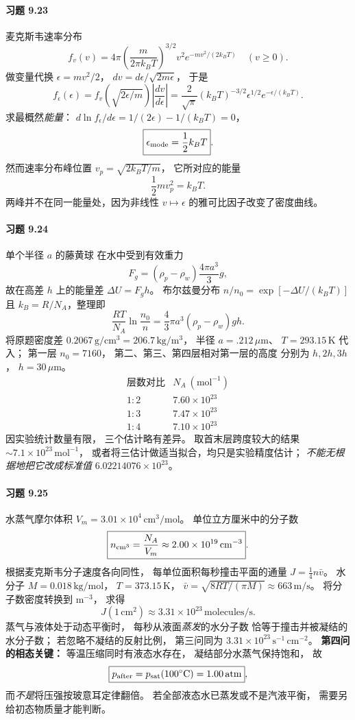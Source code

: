 \paragraph{习题 9.23}
麦克斯韦速率分布
\[
 f_v(v)=4\pi\left(\frac m{2\pi k_BT}\right)^{3/2}
 v^2e^{-mv^2/(2k_BT)}
\quad(v\ge0).
\]
做变量代换
\(\epsilon=mv^2/2\)，
\(dv=d\epsilon/\sqrt{2m\epsilon}\)，
于是
\[
 f_\epsilon(\epsilon)=f_v(\sqrt{2\epsilon/m})
 \left|\frac{dv}{d\epsilon}\right|
 =\boxed{\frac2{\sqrt\pi}(k_BT)^{-3/2}
 \epsilon^{1/2}e^{-\epsilon/(k_BT)}}.
\]
求最概然\emph{能量}：
\(d\ln f_\epsilon/d\epsilon
 =1/(2\epsilon)-1/(k_BT)=0\)，
\[
 \boxed{\epsilon_{\rm mode}=\frac12k_BT}.
\]
然而速率分布峰位置
\(v_p=\sqrt{2k_BT/m}\)，
它所对应的能量
\[
 \boxed{\frac12mv_p^2=k_BT}.
\]
两峰并不在同一能量处，因为非线性
\(v\mapsto\epsilon\) 的雅可比因子改变了密度曲线。

\paragraph{习题 9.24}
单个半径 \(a\) 的藤黄球
在水中受到有效重力
\[
 F_g=(\rho_p-\rho_w)\frac{4\pi a^3}{3}g,
\]
故在高差 \(h\) 上的能量差
\(\Delta U=F_gh\)。
布尔兹曼分布
\(n/n_0=\exp[-\Delta U/(k_BT)]\)
且 \(k_B=R/N_A\)，整理即
\[
 \boxed{\frac{RT}{N_A}\ln\frac{n_0}{n}
 =\frac43\pi a^3(\rho_p-\rho_w)gh}.
\]
将原题密度差
\(0.2067\,\mathrm{g/cm^3}=206.7\,\mathrm{kg/m^3}\)，
半径 \(a=.212\,\mu\mathrm m\)、
\(T=293.15\,\mathrm K\) 代入；
第一层 \(n_0=7160\)，
第二、第三、第四层相对第一层的高度
分别为 \(h,2h,3h\)，
\(h=30\,\mu\mathrm m\)。
\[
 \begin{array}{c|c}
 \text{层数对比}&N_A\ (\mathrm{mol^{-1}})\\\hline
 1:2&7.60\times10^{23}\\
 1:3&7.47\times10^{23}\\
 1:4&7.10\times10^{23}
 \end{array}
\]
因实验统计数量有限，
三个估计略有差异。
取首末层跨度较大的结果
\(\sim7.1\times10^{23}\,\mathrm{mol^{-1}}\)，
或者将三估计做适当拟合，均只是实验精度估计；
\emph{不能无根据地把它改成标准值}
\(6.02214076\times10^{23}\)。

\paragraph{习题 9.25}
水蒸气摩尔体积
\(V_m=3.01\times10^4\,\mathrm{cm^3/mol}\)。
单位立方厘米中的分子数
\[
 \boxed{n_{\rm cm^3}=\frac{N_A}{V_m}
 \approx2.00\times10^{19}\,\mathrm{cm^{-3}}}.
\]
根据麦克斯韦分子速度各向同性，
每单位面积每秒撞击平面的通量
\(J=\tfrac14n\bar v\)。
水分子
\(M=0.018\,\mathrm{kg/mol}\)，
\(T=373.15\,\mathrm K\)，
\(\bar v=\sqrt{8RT/(\pi M)}\approx663\,\mathrm{m/s}\)。
将分子数密度转换到 \(\mathrm{m^{-3}}\)，
求得
\[
 \boxed{J(1\,\mathrm{cm^2})
 \approx3.31\times10^{23}\,
 \mathrm{molecules/s}}.
\]
蒸气与液体处于动态平衡时，
每秒从液面\emph{蒸发}的水分子数
恰等于撞击并被凝结的水分子数；
若忽略不凝结的反射比例，
第三问同为
\(\boxed{3.31\times10^{23}\,\mathrm{s^{-1}\,cm^{-2}}}\)。
\textbf{第四问的相态关键：}
等温压缩同时有液态水存在，
凝结部分水蒸气保持饱和，
故
\[
 \boxed{p_{\rm after}=p_{\rm sat}(100^\circ\mathrm C)
 =1.00\,\mathrm{atm}},
\]
而\emph{不是}将压强按玻意耳定律翻倍。
若全部液态水已蒸发或不是汽液平衡，
需要另给初态物质量才能判断。


